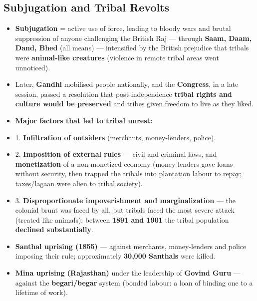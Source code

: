 \subsection{Subjugation and Tribal Revolts}

\begin{KeyConcept}
\begin{itemize}
\item \textbf{Subjugation} = active use of force, leading to bloody wars and brutal suppression of anyone challenging the British Raj --- through \textbf{Saam, Daam, Dand, Bhed} (all means) --- intensified by the British prejudice that tribals were \textbf{animal-like creatures} (violence in remote tribal areas went unnoticed).
\item Later, \textbf{Gandhi} mobilised people nationally, and the \textbf{Congress}, in a late session, passed a resolution that post-independence \textbf{tribal rights and culture would be preserved} and tribes given freedom to live as they liked.
\end{itemize}
\end{KeyConcept}

\begin{KeyConcept}
\begin{itemize}
\item \textbf{Major factors that led to tribal unrest:}
\item 1. \textbf{Infiltration of outsiders} (merchants, money-lenders, police).
\item 2. \textbf{Imposition of external rules} --- civil and criminal laws, and \textbf{monetization} of a non-monetized economy (money-lenders gave loans without security, then trapped the tribals into plantation labour to repay; taxes/lagaan were alien to tribal society).
\item 3. \textbf{Disproportionate impoverishment and marginalization} --- the colonial brunt was faced by all, but tribals faced the most severe attack (treated like animals); between \textbf{1891 and 1901} the tribal population \textbf{declined substantially}.
\end{itemize}
\end{KeyConcept}

\begin{ExampleBox}
\begin{itemize}
\item \textbf{Santhal uprising (1855)} --- against merchants, money-lenders and police imposing their rule; approximately \textbf{30,000 Santhals} were killed.
\item \textbf{Mina uprising (Rajasthan)} under the leadership of \textbf{Govind Guru} --- against the \textbf{begari/begar} system (bonded labour: a loan of  binding one to a lifetime of work).
\end{itemize}
\end{ExampleBox}

